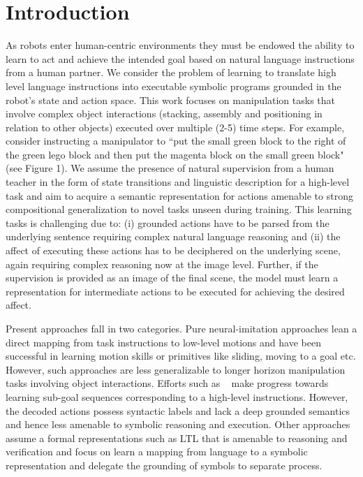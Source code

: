\section{Introduction}
\label{sec:intro}
As robots enter human-centric environments they must be endowed the ability to 
learn to act and achieve the intended goal based on natural language instructions 
from a human partner. 
%
We consider the problem of learning to translate high level language instructions into 
executable symbolic programs grounded in the robot’s state and action space. 
%
This work focuses on  
manipulation tasks that involve complex object interactions (stacking, assembly and 
positioning in relation to other objects) executed over multiple (2-5) time steps. 
%
For example, consider instructing a manipulator to ``put the small green block to the right of the green lego block and then put the magenta block on the small green block" (see Figure 1). 
%
We assume the presence of natural supervision from a human teacher in the form of 
state transitions and linguistic description for a high-level task and aim to 
acquire a semantic representation for actions amenable to strong 
compositional generalization to novel tasks unseen during training.  
%
This learning tasks is challenging due to: (i) grounded actions have to be parsed from the underlying sentence requiring complex natural language reasoning and (ii) the affect of executing these actions has to be deciphered on the underlying scene, again requiring complex reasoning now at the image level. Further, if the supervision is provided as an image of the final scene, the model must learn a representation for intermediate actions to be executed for achieving the desired affect.

%
Present approaches fall in two categories. Pure neural-imitation 
approaches lean a direct mapping from task instructions to low-level motions and have been successful in learning motion skills or primitives like sliding, moving to a goal etc. However, such approaches are less generalizable to longer horizon manipulation tasks involving object interactions. Efforts such as ~\cite{paxton2019prospection} make progress towards learning sub-goal sequences corresponding to a high-level instructions. However, the decoded actions possess 
syntactic labels and lack a deep grounded semantics and hence less amenable to symbolic reasoning and execution.  
%
Other approaches \cite{shah2018bayesian} assume a formal representations such as LTL that is amenable 
to reasoning and verification and focus on learn a mapping from language to a symbolic representation and delegate the grounding of symbols to separate process. 

